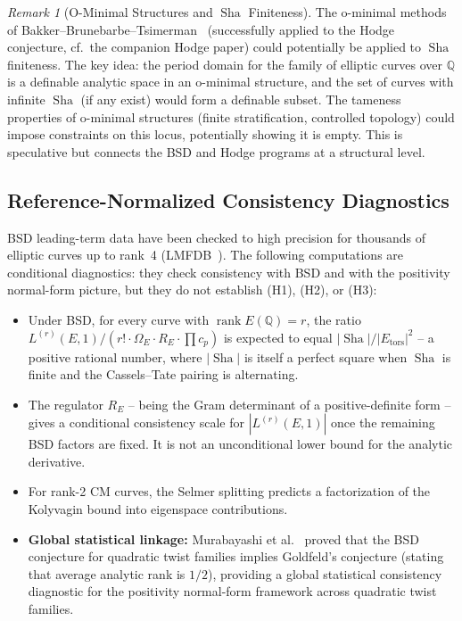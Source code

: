 \documentclass[aps,prd,twocolumn,superscriptaddress,nofootinbib,floatfix]{revtex4-2}
\theoremstyle{definition}
\theoremstyle{remark}
\newtheorem{remark}[theorem]{Remark}
\DeclareMathOperator{\rank}{rank}
\DeclareMathOperator{\Sha}{Sha}
\begin{document}
\begin{remark}[O-Minimal Structures and $\Sha$ Finiteness]
\label{rem:o-minimal-sha}
The o-minimal methods of Bakker--Brunebarbe--Tsimerman~\cite{BBT2023} (successfully applied to the Hodge conjecture, cf.\ the companion Hodge paper) could potentially be applied to $\Sha$ finiteness. The key idea: the period domain for the family of elliptic curves over $\mathbb{Q}$ is a definable analytic space in an o-minimal structure, and the set of curves with infinite $\Sha$ (if any exist) would form a definable subset. The tameness properties of o-minimal structures (finite stratification, controlled topology) could impose constraints on this locus, potentially showing it is empty. This is speculative but connects the BSD and Hodge programs at a structural level.
\end{remark}

\subsection{Reference-Normalized Consistency Diagnostics}
\label{sec:numerical}

BSD leading-term data have been checked to high precision for thousands of elliptic curves up to rank~4 (LMFDB~\cite{LMFDB}). The following computations are conditional diagnostics: they check consistency with BSD and with the positivity normal-form picture, but they do not establish (H1), (H2), or (H3):
\begin{itemize}
\item Under BSD, for every curve with $\rank E(\mathbb{Q}) = r$, the ratio $L^{(r)}(E,1)/(r! \cdot \Omega_E \cdot R_E \cdot \prod c_p)$ is expected to equal $|\Sha|/|E_{\mathrm{tors}}|^2$ -- a positive rational number, where $|\Sha|$ is itself a perfect square when $\Sha$ is finite and the Cassels--Tate pairing is alternating.
\item The regulator $R_E$ -- being the Gram determinant of a positive-definite form -- gives a conditional consistency scale for $|L^{(r)}(E,1)|$ once the remaining BSD factors are fixed. It is not an unconditional lower bound for the analytic derivative.
\item For rank-2 CM curves, the Selmer splitting predicts a factorization of the Kolyvagin bound into eigenspace contributions.
\item \textbf{Global statistical linkage:} Murabayashi et al.~\cite{Murabayashi2025} proved that the BSD conjecture for quadratic twist families implies Goldfeld's conjecture (stating that average analytic rank is $1/2$), providing a global statistical consistency diagnostic for the positivity normal-form framework across quadratic twist families.
\end{itemize}
\end{document}
